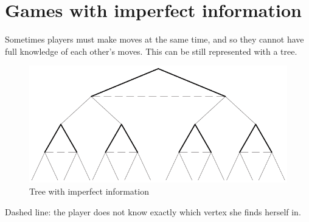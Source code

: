 \section{Games with imperfect information}

Sometimes players must make moves at the same time, and so they cannot have full knowledge of each other’s moves. 
This can be still represented with a tree.
\begin{figure}[H]
    \centering
    \includegraphics[width=0.75\linewidth]{images/tree3.png}
    \caption{Tree with imperfect information}
\end{figure}
Dashed line: the player does not know exactly which vertex she finds herself in.

